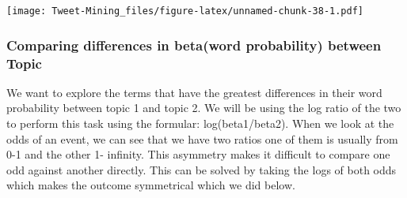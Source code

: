 \documentclass[
]{article}
\newenvironment{Shaded}{\begin{snugshade}}{\end{snugshade}}
\newcommand{\CommentTok}[1]{\textcolor[rgb]{0.56,0.35,0.01}{\textit{#1}}}
\newcommand{\DataTypeTok}[1]{\textcolor[rgb]{0.13,0.29,0.53}{#1}}
\newcommand{\DecValTok}[1]{\textcolor[rgb]{0.00,0.00,0.81}{#1}}
\newcommand{\KeywordTok}[1]{\textcolor[rgb]{0.13,0.29,0.53}{\textbf{#1}}}
\newcommand{\NormalTok}[1]{#1}
\newcommand{\OperatorTok}[1]{\textcolor[rgb]{0.81,0.36,0.00}{\textbf{#1}}}
\newcommand{\OtherTok}[1]{\textcolor[rgb]{0.56,0.35,0.01}{#1}}
\newcommand{\StringTok}[1]{\textcolor[rgb]{0.31,0.60,0.02}{#1}}
\begin{document}
\begin{Shaded}
\end{Shaded}

\texttt{[image: Tweet-Mining\_files/figure-latex/unnamed-chunk-38-1.pdf]}

\hypertarget{comparing-differences-in-betaword-probability-between-topic}{%
\subsubsection{Comparing differences in beta(word probability) between
Topic}\label{comparing-differences-in-betaword-probability-between-topic}}

We want to explore the terms that have the greatest differences in their
word probability between topic 1 and topic 2. We will be using the log
ratio of the two to perform this task using the formular:
log(beta1/beta2). When we look at the odds of an event, we can see that
we have two ratios one of them is usually from 0-1 and the other 1-
infinity. This asymmetry makes it difficult to compare one odd against
another directly. This can be solved by taking the logs of both odds
which makes the outcome symmetrical which we did below.
\end{document}
